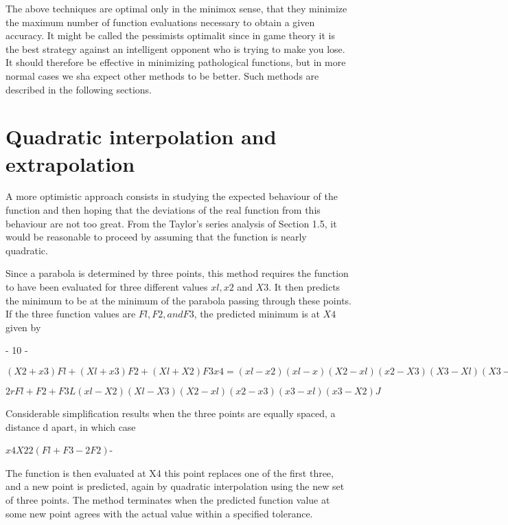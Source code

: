      The above techniques are optimal only in the minimox sense, that
they minimize the maximum number of function evaluations necessary to
obtain a given accuracy.  It might be called the pessimists optimalit
since in game theory it is the best strategy against an intelligent
opponent who is trying to make you lose.  It should therefore be
effective
in minimizing pathological functions, but in more normal cases we sha
expect other methods to be better.  Such methods are described in the
following sections.
 
 
\section{Quadratic interpolation and extrapolation}
 
     A more optimistic approach consists in studying the expected
behaviour of the function and then hoping that the deviations of the
real function from this behaviour are not too great.  From the Taylor's
series analysis of Section 1.5, it would be reasonable to proceed by
assuming that the function is nearly quadratic.
 
     Since a parabola is determined by three points, this method requires
the function to have been evaluated for three different values $xl, x2$
and $X3$. It then predicts the minimum to be at the minimum of the
parabola passing through these points.  If the three function values are
$Fl, F2, and F3$, the predicted minimum is at $X4$ given by
 
 
                            - 10 -
 
 
            $(X2 + x3)Fl      +     (Xl + x3)F2      +      (Xl + X2)F3
  x4 =  (xl - x2)(xl - x)      (X2 - xl)(x2 - X3)      (X3 - Xl)(X3- X2)$
 
              $2 r Fl         +          F2          +          F3
        L(xl - X2)(Xl - X3)     (X2 - xl)(x2 - x3)     (x3 - xl)(x3 - X2)J$
 
 
Considerable simplification results when the three points are equally
spaced, a distance d apart, in which case
 
 
                    $x4   X2   2 (Fl + F3 - 2F2) $-
 
 
The function is then evaluated at X4 this point replaces one of the
first three, and a new point is predicted, again by quadratic
interpolation using the new set of three points.
The method terminates when the
predicted function value at some new point agrees with the actual value
within a specified tolerance.
 
